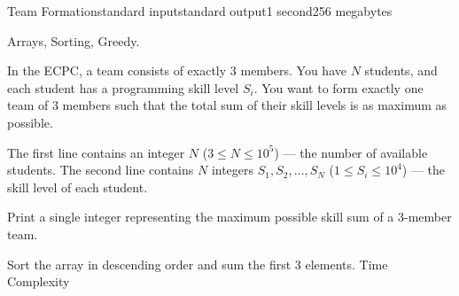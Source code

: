 \begin{problem}{Team Formation}{standard input}{standard output}{1 second}{256 megabytes}

Arrays, Sorting, Greedy.

In the ECPC, a team consists of exactly 3 members. You have $N$ students, and each student has a programming skill level $S_i$. You want to form exactly one team of 3 members such that the total sum of their skill levels is as maximum as possible.

\InputFile
The first line contains an integer $N$ ($3 \le N \le 10^5$) --- the number of available students.
The second line contains $N$ integers $S_1, S_2, \dots, S_N$ ($1 \le S_i \le 10^4$) --- the skill level of each student.

\OutputFile
Print a single integer representing the maximum possible skill sum of a 3-member team.

\Example

\begin{example}
%
\end{example}

\Note
Sort the array in descending order and sum the first 3 elements. Time Complexity

\end{problem}

